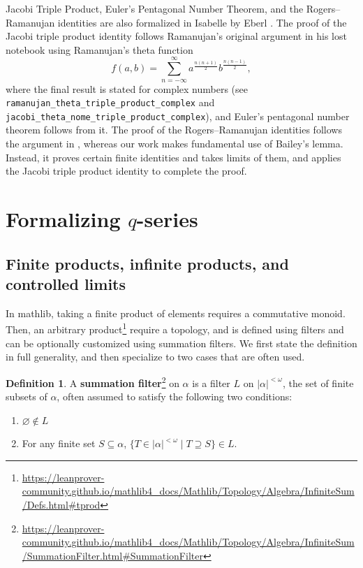 \documentclass[12pt]{amsart}
\theoremstyle{definition}
\newtheorem{definition}[theorem]{Definition}
\theoremstyle{remark}
\numberwithin{equation}{subsection}
\begin{document}
Jacobi Triple Product, Euler's Pentagonal Number Theorem, and the Rogers--Ramanujan identities are also formalized in Isabelle \cite{isabelle} by Eberl \cite{isabelle-theta,isabelle-pentagonal,isabelle-rr}.
The proof of the Jacobi triple product identity follows Ramanujan's original argument in his lost notebook \cite{Berndt} using Ramanujan's theta function
$$
f(a,b) = \sum_{n=-\infty}^{\infty} a^{\frac{n(n+1)}{2}} b^{\frac{n(n-1)}{2}},
$$
where the final result is stated for complex numbers (see \texttt{ramanujan\_theta\_triple\_product\_complex} and \texttt{jacobi\_theta\_nome\_triple\_product\_complex}), and Euler's pentagonal number theorem follows from it.
The proof of the Rogers--Ramanujan identities follows the argument in \cite{AndrewsPartition}, whereas our work makes fundamental use of Bailey's lemma. Instead, it proves certain finite identities and takes limits of them, and applies the Jacobi triple product identity to complete the proof.


\section{Formalizing \texorpdfstring{$q$}{q}-series}\label{sec:Formalizing_q_series}

\subsection{Finite products, infinite products, and controlled limits}

In mathlib, taking a finite product of elements requires a commutative monoid. Then, an arbitrary product\footnote{\url{https://leanprover-community.github.io/mathlib4_docs/Mathlib/Topology/Algebra/InfiniteSum/Defs.html\#tprod}} require a topology, and is defined using filters and can be optionally customized using summation filters. We first state the definition in full generality, and then specialize to two cases that are often used.

\begin{definition}
    A \textbf{summation filter}\footnote{\url{https://leanprover-community.github.io/mathlib4_docs/Mathlib/Topology/Algebra/InfiniteSum/SummationFilter.html\#SummationFilter}} on $\alpha$ is a filter $L$ on $|\alpha|^{<\omega}$, the set of finite subsets of $\alpha$, often assumed to satisfy the following two conditions:
\begin{enumerate}
    \item $\varnothing \notin L$
    \item For any finite set $S \subseteq \alpha$, $\{T \in |\alpha|^{<\omega} \mid T \supseteq S\} \in L$.
\end{enumerate}
\end{definition}
\end{document}
